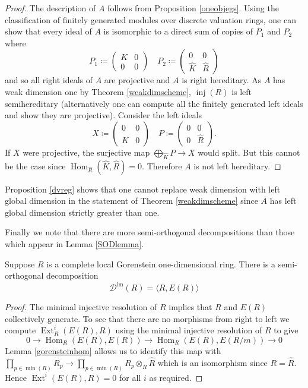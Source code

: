 \documentclass[12pt,oneside]{amsart}
\DeclareMathOperator{\Hom}{Hom}
\DeclareMathOperator{\Ext}{Ext}
\DeclareMathOperator{\inj}{inj}
\DeclareMathOperator{\immac}{im}
\begin{document}
\begin{proof}
The description of $A$ follows from Proposition \ref{oneobjegs}. Using the classification of finitely generated modules over discrete valuation rings, one can show that every ideal of $A$ is isomorphic to a direct sum of copies of $P_1$ and $P_2$ where 
\[
P_1 \coloneq \begin{pmatrix}
K & 0 \\
0 & 0
\end{pmatrix} \quad P_2 \coloneq \begin{pmatrix}
0 & 0 \\
\widehat{K} & \widehat{R}
\end{pmatrix}
\]
and so all right ideals of $A$ are projective and $A$ is right hereditary. As $A$ has weak dimension one by Theorem \ref{weakdimscheme}, $\inj(R)$ is left semihereditary (alternatively one can compute all the finitely generated left ideals and show they are projective). Consider the left ideals
\[
X \coloneq  \begin{pmatrix}
0 & 0 \\
\widehat{K} & 0
\end{pmatrix} \quad P \coloneq \begin{pmatrix}
0 & 0 \\
0 & \widehat{R}
\end{pmatrix}.
\]
If $X$ were projective, the surjective map $\bigoplus_{\widehat{K}} P \to X$ would split. But this cannot be the case since $\Hom_{\widehat{R}}(\widehat{K},\widehat{R}) = 0$. Therefore $A$ is not left hereditary. 
\end{proof}




\begin{remark}
Proposition \ref{dvreg} shows that one cannot replace weak dimension with left global dimension in the statement of Theorem \ref{weakdimscheme} since $A$ has left global dimension strictly greater than one. 
\end{remark}

Finally we note that there are more semi-orthogonal decompositions than those which appear in Lemma \ref{SODlemma}.


\begin{prop} \label{SODeg}
Suppose $R$ is a complete local Gorenstein one-dimensional ring. There is a semi-orthogonal decomposition
\[
\mathcal{D}^{\immac}(R) = \langle R, E(R) \rangle
\]
\end{prop}

\begin{proof}
The minimal injective resolution of $R$ implies that $R$ and $E(R)$ collectively generate. To see that there are no morphisms from right to left we compute $\Ext^i_R(E(R),R)$ using the minimal injective resolution of $R$ to give
\[
0 \to \Hom_R(E(R),E(R)) \to \Hom_R(E(R),E(R/m)) \to 0
\]
Lemma \ref{gorensteinhom} allows us to identify this map with $\prod_{p \in \min(R)} R_p \to \prod_{p \in \min(R)} R_p \otimes_R \widehat{R}$ which is an isomorphism since $R = \widehat{R}$. Hence $\Ext^i(E(R),R) = 0$ for all $i$ as required. 
\end{proof}
\end{document}
